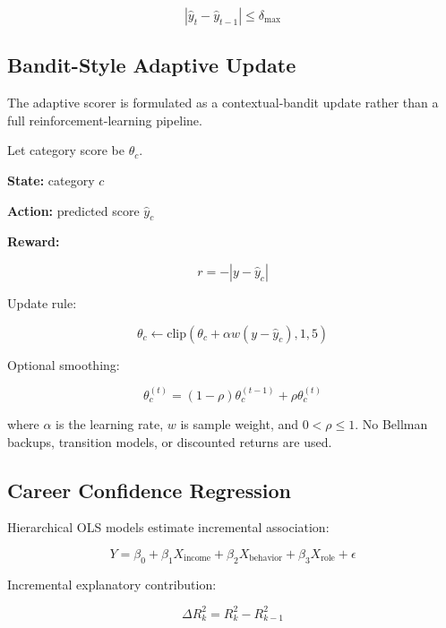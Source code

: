 \documentclass[conference]{IEEEtran}
\begin{document}
\begin{equation}
\left| \hat{y}_t - \hat{y}_{t-1} \right| \le \delta_{\max}
\end{equation}

\subsection{Bandit-Style Adaptive Update}

The adaptive scorer is formulated as a contextual-bandit update rather than a full reinforcement-learning pipeline.

Let category score be $\theta_c$.

\textbf{State:} category $c$

\textbf{Action:} predicted score $\hat{y}_c$

\textbf{Reward:}

\begin{equation}
r = -\left| y - \hat{y}_c \right|
\end{equation}

Update rule:

\begin{equation}
\theta_c \leftarrow \mathrm{clip}\left(\theta_c + \alpha w (y-\hat{y}_c), 1, 5\right)
\end{equation}

Optional smoothing:

\begin{equation}
\theta_c^{(t)} = (1-\rho)\theta_c^{(t-1)} + \rho \theta_c^{(t)}
\end{equation}

where $\alpha$ is the learning rate, $w$ is sample weight, and $0 < \rho \le 1$.  
No Bellman backups, transition models, or discounted returns are used.

\subsection{Career Confidence Regression}

Hierarchical OLS models estimate incremental association:

\begin{equation}
Y = \beta_0 + \beta_1 X_{\text{income}} + \beta_2 X_{\text{behavior}} + \beta_3 X_{\text{role}} + \epsilon
\end{equation}

Incremental explanatory contribution:

\begin{equation}
\Delta R_k^2 = R_k^2 - R_{k-1}^2
\end{equation}
\end{document}
